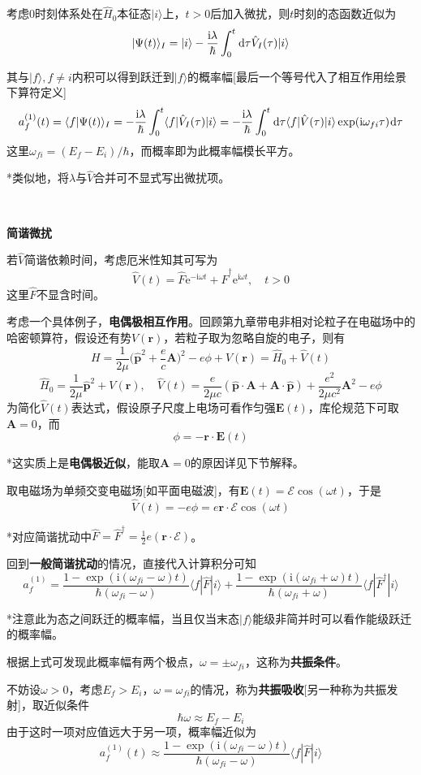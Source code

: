 \documentclass[a4paper,UTF8,fontset=windows]{ctexart}
\newcommand*{\dr}{\hspace{0.07em}\mathrm{d}}
\newcommand*{\ir}{\mathrm{i}}
\newcommand*{\er}{\mathrm{e}}
\newcommand*{\ket}[1]{|#1\rangle}
\newcommand*{\bk}[2]{\langle#1|#2\rangle}
\newcommand*{\blk}[3]{\langle#1|#2|#3\rangle}
\newcommand*{\br}{\mathbf{r}}
\newcommand*{\bp}{\mathbf{p}}
\newcommand*{\ba}{\mathbf{A}}
\begin{document}
考虑0时刻体系处在$\hat{H}_0$本征态$\ket{i}$上，$t>0$后加入微扰，则$t$时刻的态函数近似为
$$\ket{\Psi(t)}_I=\ket{i}-\frac{\ir\lambda}{\hbar}\int_0^t\dr\tau\hat{V}_I(\tau)\ket{i}$$

其与$\ket{f},f\ne i$内积可以得到跃迁到$\ket{f}$的概率幅[最后一个等号代入了相互作用绘景下算符定义]
$$a_f^{(1)}(t)=\bk{f}{\Psi(t)}_I=-\frac{\ir\lambda}{\hbar}\int_0^t\blk{f}{\hat{V}_I(\tau)}{i}=-\frac{\ir\lambda}{\hbar}\int_0^t\dr\tau\blk{f}{\hat{V}(\tau)}{i}\exp(\ir\omega_{fi}\tau)\dr\tau$$
这里$\omega_{fi}=(E_f-E_i)/\hbar$，而概率即为此概率幅模长平方。

*类似地，将$\lambda$与$\hat{V}$合并可不显式写出微扰项。

\

\textbf{简谐微扰}

若$\hat{V}$简谐依赖时间，考虑厄米性知其可写为
$$\hat{V}(t)=\hat{F}\er^{-\ir\omega t}+\hat{F}^\dagger\er^{\ir\omega t},\quad t>0$$
这里$\hat{F}$不显含时间。

考虑一个具体例子，\textbf{电偶极相互作用}。回顾第九章带电非相对论粒子在电磁场中的哈密顿算符，假设还有势$V(\br)$，若粒子取为忽略自旋的电子，则有
$$H=\frac{1}{2\mu}\bigg(\hat{\bp}^2+\frac{e}{c}\ba\bigg)^2-e\phi+V(\br)=\hat{H}_0+\hat{V}(t)$$
$$\hat{H}_0=\frac{1}{2\mu}\hat{\bp}^2+V(\br),\quad\hat{V}(t)=\frac{e}{2\mu c}(\hat{\bp}\cdot\ba+\ba\cdot\hat{\bp})+\frac{e^2}{2\mu c^2}\ba^2-e\phi$$
为简化$\hat{V}(t)$表达式，假设原子尺度上电场可看作匀强$\mathbf{E}(t)$，库伦规范下可取$\ba=0$，而
$$\phi=-\br\cdot\mathbf{E}(t)$$

*这实质上是\textbf{电偶极近似}，能取$\ba=0$的原因详见下节解释。

取电磁场为单频交变电磁场[如平面电磁波]，有$\mathbf{E}(t)=\mathcal{E}\cos(\omega t)$，于是
$$\hat{V}(t)=-e\phi=e\br\cdot\mathcal{E}\cos(\omega t)$$

*对应简谐扰动中$\hat{F}=\hat{F}^\dagger=\frac{1}{2}e(\br\cdot\mathcal{E})$。

回到\textbf{一般简谐扰动}的情况，直接代入计算积分可知
$$a_f^{(1)}=\frac{1-\exp(\ir(\omega_{fi}-\omega)t)}{\hbar(\omega_{fi}-\omega)}\blk{f}{\hat{F}}{i}+\frac{1-\exp(\ir(\omega_{fi}+\omega)t)}{\hbar(\omega_{fi}+\omega)}\blk{f}{\hat{F}^\dagger}{i}$$

*注意此为态之间跃迁的概率幅，当且仅当末态$\ket{f}$能级非简并时可以看作能级跃迁的概率幅。

根据上式可发现此概率幅有两个极点，$\omega=\pm\omega_{fi}$，这称为\textbf{共振条件}。

不妨设$\omega>0$，考虑$E_f>E_i$，$\omega=\omega_{fi}$的情况，称为\textbf{共振吸收}[另一种称为共振发射]，取近似条件
$$\hbar\omega\approx E_f-E_i$$
由于这时一项对应值远大于另一项，概率幅近似为
$$a_f^{(1)}(t)\approx\frac{1-\exp(\ir(\omega_{fi}-\omega)t)}{\hbar(\omega_{fi}-\omega)}\blk{f}{\hat{F}}{i}$$
\end{document}
